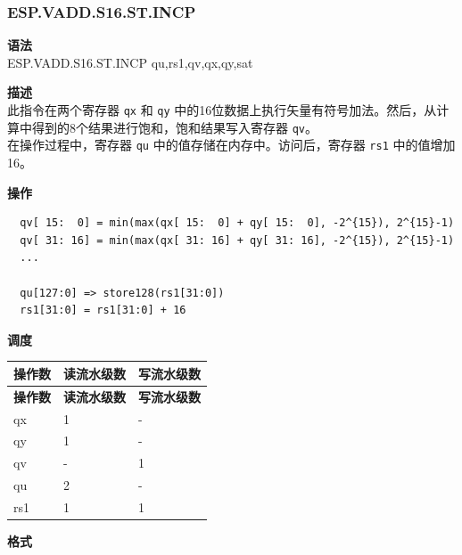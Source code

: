 \newpage

\newpage
\subsubsection{ESP.VADD.S16.ST.INCP}\label{instruction:ESPVADDS16STINCP}
\textbf{语法}\\
ESP.VADD.S16.ST.INCP qu,rs1,qv,qx,qy,sat

\textbf{描述}\\
此指令在两个寄存器 \lstinline{qx} 和 \lstinline{qy} 中的16位数据上执行矢量有符号加法。然后，从计算中得到的8个结果进行饱和，饱和结果写入寄存器 \lstinline{qv}。\\ 在操作过程中，寄存器 \lstinline{qu} 中的值存储在内存中。访问后，寄存器 \lstinline{rs1} 中的值增加16。

\textbf{操作}\\
\begin{lstlisting}
  qv[ 15:  0] = min(max(qx[ 15:  0] + qy[ 15:  0], -2^{15}), 2^{15}-1)
  qv[ 31: 16] = min(max(qx[ 31: 16] + qy[ 31: 16], -2^{15}), 2^{15}-1)
  ...

  qu[127:0] => store128(rs1[31:0])
  rs1[31:0] = rs1[31:0] + 16
\end{lstlisting}

\textbf{调度}\\
\begin{longtable}[c]{|l|l|l|}
    \hline
    \rowcolor{lightgray}
    \textbf{操作数} & \textbf{读流水级数} & \textbf{写流水级数} \\\hline
    \endfirsthead
    \hline
    \rowcolor{lightgray}
     \textbf{操作数} & \textbf{读流水级数} & \textbf{写流水级数} \\\hline
    \endhead
    \hline
    \endfoot

    qx & 1 & - \\\hline
  qy & 1 & - \\\hline
     qv & - & 1 \\\hline
     qu & 2 & - \\\hline
     rs1 & 1 & 1

\end{longtable}

\textbf{格式}\\


